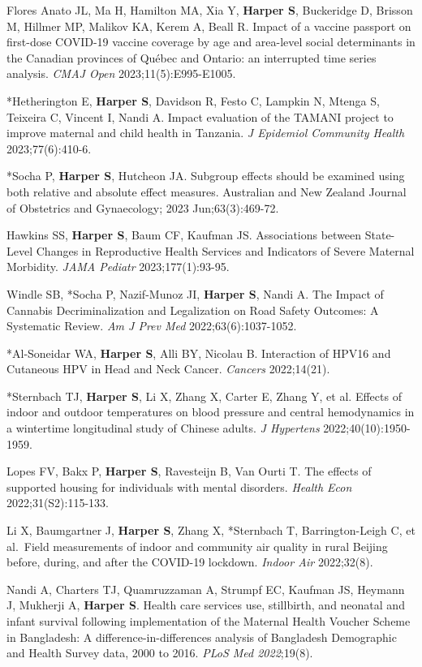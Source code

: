 \documentclass[
  letterpaper,
  DIV=11,
  numbers=noendperiod]{scrartcl}
\begin{document}
Flores Anato JL, Ma H, Hamilton MA, Xia Y, \textbf{Harper S}, Buckeridge
D, Brisson M, Hillmer MP, Malikov KA, Kerem A, Beall R. Impact of a
vaccine passport on first-dose COVID-19 vaccine coverage by age and
area-level social determinants in the Canadian provinces of Québec and
Ontario: an interrupted time series analysis. \emph{CMAJ Open}
2023;11(5):E995-E1005.

*Hetherington E, \textbf{Harper S}, Davidson R, Festo C, Lampkin N,
Mtenga S, Teixeira C, Vincent I, Nandi A. Impact evaluation of the
TAMANI project to improve maternal and child health in Tanzania. \emph{J
Epidemiol Community Health} 2023;77(6):410-6.

*Socha P, \textbf{Harper S}, Hutcheon JA. Subgroup effects should be
examined using both relative and absolute effect measures. Australian
and New Zealand Journal of Obstetrics and Gynaecology; 2023
Jun;63(3):469-72.

Hawkins SS, \textbf{Harper S}, Baum CF, Kaufman JS. Associations between
State-Level Changes in Reproductive Health Services and Indicators of
Severe Maternal Morbidity. \emph{JAMA Pediatr} 2023;177(1):93-95.

Windle SB, *Socha P, Nazif-Munoz JI, \textbf{Harper S}, Nandi A. The
Impact of Cannabis Decriminalization and Legalization on Road Safety
Outcomes: A Systematic Review. \emph{Am J Prev Med}
2022;63(6):1037-1052.

*Al-Soneidar WA, \textbf{Harper S}, Alli BY, Nicolau B. Interaction of
HPV16 and Cutaneous HPV in Head and Neck Cancer. \emph{Cancers}
2022;14(21).

*Sternbach TJ, \textbf{Harper S}, Li X, Zhang X, Carter E, Zhang Y, et
al. Effects of indoor and outdoor temperatures on blood pressure and
central hemodynamics in a wintertime longitudinal study of Chinese
adults. \emph{J Hypertens} 2022;40(10):1950-1959.

Lopes FV, Bakx P, \textbf{Harper S}, Ravesteijn B, Van Ourti T. The
effects of supported housing for individuals with mental disorders.
\emph{Health Econ} 2022;31(S2):115-133.

Li X, Baumgartner J, \textbf{Harper S}, Zhang X, *Sternbach T,
Barrington-Leigh C, et al.~Field measurements of indoor and community
air quality in rural Beijing before, during, and after the COVID-19
lockdown. \emph{Indoor Air} 2022;32(8).

Nandi A, Charters TJ, Quamruzzaman A, Strumpf EC, Kaufman JS, Heymann J,
Mukherji A, \textbf{Harper S}. Health care services use, stillbirth, and
neonatal and infant survival following implementation of the Maternal
Health Voucher Scheme in Bangladesh: A difference-in-differences
analysis of Bangladesh Demographic and Health Survey data, 2000 to 2016.
\emph{PLoS Med 2022};19(8).
\end{document}

